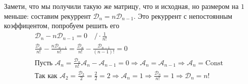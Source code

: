 \begin{solution}
    Замети, что мы получили такую же матрицу, что и исходная, но размером на $1$ меньше: составим рекуррент $\mathcal{D}_n = n \mathcal{D}_{n-1}$.
    Это рекуррент с непостоянным коэффицентом, попробуем решить его
    \begin{gather}
        \mathcal{D}_n - n\mathcal{D}_{n-1} = 0 \quad / \cdot\frac{1}{n!}\\
        \frac{\mathcal{D}_n}{n!} - \frac{n\mathcal{D}_{n-1}}{n!} = \frac{\mathcal{D}_n}{n!} - \frac{\mathcal{D}_{n-1}}{(n-1)!} = 0 \quad \\
        \text{Пусть } \mathcal{A}_n = \frac{\mathcal{D}_n}{n!}
        \mathcal{A}_n - \mathcal{A}_{n-1} = 0 \Longrightarrow \mathcal{A}_n = \mathcal{A}_{n-1} \Longrightarrow \mathcal{A}_n = \text{Const} \\
        \text{Так как } \mathcal{A}_2 = \frac{\mathcal{D}_2}{2} = \frac{2}{2} = 2 \Longrightarrow \mathcal{A}_n = 1 \Longrightarrow \frac{\mathcal{D}_n}{n!} = 1 \Longrightarrow \mathcal{D}_n = n!
    \end{gather}
\end{solution}